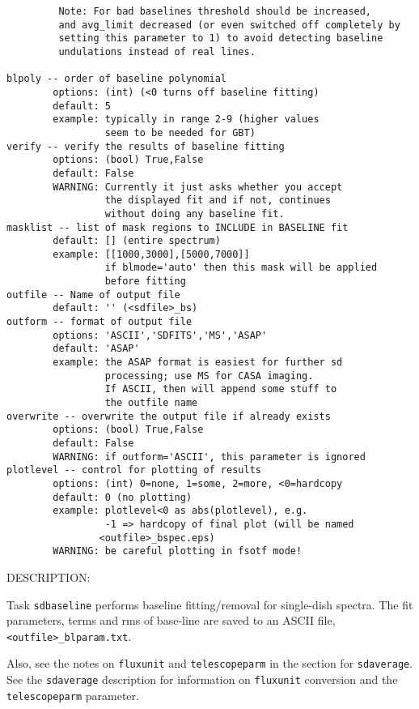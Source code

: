 \begin{verbatim}
         Note: For bad baselines threshold should be increased,
         and avg_limit decreased (or even switched off completely by
         setting this parameter to 1) to avoid detecting baseline
         undulations instead of real lines.

blpoly -- order of baseline polynomial
        options: (int) (<0 turns off baseline fitting)
        default: 5
        example: typically in range 2-9 (higher values
                 seem to be needed for GBT)
verify -- verify the results of baseline fitting
        options: (bool) True,False
        default: False
        WARNING: Currently it just asks whether you accept
                 the displayed fit and if not, continues
                 without doing any baseline fit.
masklist -- list of mask regions to INCLUDE in BASELINE fit
        default: [] (entire spectrum)
        example: [[1000,3000],[5000,7000]]
                 if blmode='auto' then this mask will be applied
                 before fitting
outfile -- Name of output file
        default: '' (<sdfile>_bs)
outform -- format of output file
        options: 'ASCII','SDFITS','MS','ASAP'
        default: 'ASAP'
        example: the ASAP format is easiest for further sd
                 processing; use MS for CASA imaging.
                 If ASCII, then will append some stuff to
                 the outfile name
overwrite -- overwrite the output file if already exists
        options: (bool) True,False
        default: False
        WARNING: if outform='ASCII', this parameter is ignored
plotlevel -- control for plotting of results
        options: (int) 0=none, 1=some, 2=more, <0=hardcopy
        default: 0 (no plotting)
        example: plotlevel<0 as abs(plotlevel), e.g.
                 -1 => hardcopy of final plot (will be named
                <outfile>_bspec.eps)
        WARNING: be careful plotting in fsotf mode!

\end{verbatim}

    DESCRIPTION:

    Task {\tt sdbaseline} performs baseline fitting/removal for single-dish spectra.
    The fit parameters, terms and rms of base-line are saved to an ASCII
    file, {\tt <outfile>\_blparam.txt}.

    Also, see the notes on {\tt fluxunit} and {\tt telescopeparm} in the section for
    {\tt sdaverage}.
    See the {\tt sdaverage} description for information on {\tt fluxunit} 
    conversion and the {\tt telescopeparm} parameter.

